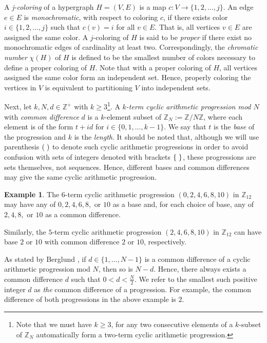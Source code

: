 \documentclass{article}
\theoremstyle{definition}
\newtheorem*{example}{Example}
\theoremstyle{remark}
\begin{document}
A \textit{j-coloring} of a hypergraph $H = (V,E)$ is a map $c : V \to \{1,2,\ldots,j\}$. An edge $e \in E$ is \textit{monochromatic}, with respect to coloring $c$, if there exists color $i \in \{1,2,\ldots,j\}$ such that $c(v) = i$ for all $v \in E$. That is, all vertices $v \in E$ are assigned the same color. A $j$-coloring of $H$ is said to be \textit{proper} if there exist no monochromatic edges of cardinality at least two. Correspondingly, the \textit{chromatic number} $\chi(H)$ of $H$ is defined to be the smallest number of colors necessary to define a proper coloring of $H$. Note that with a proper coloring of $H$, all vertices assigned the same color form an independent set. Hence, properly coloring the vertices in $V$ is equivalent to partitioning $V$ into independent sets.

Next, let $k,N, d\in \mathbb{Z}^+$ with $k \geq 3$\footnote{Note that we must have $k \geq 3$, for any two consecutive elements of a $k$-subset of $\mathbb{Z}_{N}$ automatically form a two-term cyclic arithmetic progression.}. A \textit{$k$-term cyclic arithmetic progression mod $N$} with \textit{common difference} $d$ is a $k$-element subset of $\mathbb{Z}_{N} := \mathbb{Z} / N\mathbb{Z}$, where each element is of the form $t+id$ for $i \in \{0,1,\ldots,k-1\}$. We say that $t$ is the \textit{base} of the progression and $k$ is the \textit{length}. It should be noted that, although we will use parenthesis $(\hspace{0.3em} )$ to denote such cyclic arithmetic progressions in order to avoid confusion with sets of integers denoted with brackets $\{ \hspace{0.3em}\}$, these progressions are sets themselves, not sequences. Hence, different bases and common differences may give the same cyclic arithmetic progression.

\begin{example}
\label{ex1}
    The $6$-term cyclic arithmetic progression $(0,2,4,6,8,10)$ in $\mathbb{Z}_{12}$ may have any of $0,2,4,6,8,$ or $10$ as a base and, for each choice of base, any of $2,4,8,$ or $10$ as a common difference.

   Similarly, the $5$-term cyclic arithmetic progression $(2,4,6,8,10)$ in $\mathbb{Z}_{12}$ can have base $2$ or $10$ with common difference $2$ or $10$, respectively.
\end{example}

As stated by Berglund \cite{Berglund}, if $d \in \{1,\ldots,N-1\}$ is a common difference of a cyclic arithmetic progression mod $N$, then so is $N-d$. Hence, there always exists a common difference $d$ such that $0 < d < \frac{N}{2}$. We refer to the smallest such positive integer $d$ as \textit{the} common difference of a progression. For example, the common difference of both progressions in the above example is $2$.
\end{document}
